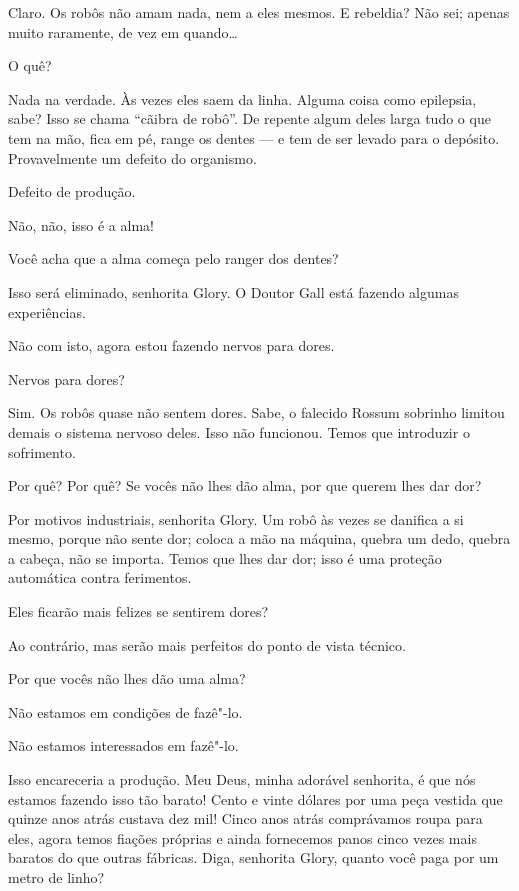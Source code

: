  Claro. Os robôs não amam nada, nem a eles mesmos. E rebeldia? Não
sei; apenas muito raramente, de vez em quando\ldots{}

 O quê?

 Nada na verdade. Às vezes eles saem da linha. Alguma coisa como
epilepsia, sabe? Isso se chama ``cãibra de robô''. De repente algum deles larga
tudo o que tem na mão, fica em pé, range os dentes --- e tem de ser levado para o depósito.
Provavelmente um defeito do organismo.

 Defeito de produção.

 Não, não, isso é a alma!

 Você acha que a alma começa pelo ranger dos dentes?

 Isso será eliminado, senhorita Glory. O Doutor Gall está fazendo algumas
experiências.

 Não com isto, agora estou fazendo nervos para dores.

 Nervos para dores?

 Sim. Os robôs quase não sentem dores. Sabe, o falecido Rossum sobrinho
limitou demais o sistema nervoso deles. Isso não funcionou. Temos que introduzir
o sofrimento.

 Por quê? Por quê? Se vocês não lhes dão alma, por que querem lhes dar
dor?

 Por motivos industriais, senhorita Glory. Um robô às vezes se danifica
a si mesmo, porque não sente dor; coloca a mão na máquina, quebra um dedo,
quebra a cabeça, não se importa. Temos que lhes dar dor; isso é uma proteção
automática contra ferimentos.

 Eles ficarão mais felizes se sentirem dores?

 Ao contrário, mas serão mais perfeitos do ponto de vista técnico.

 Por que vocês não lhes dão uma alma?

 Não estamos em condições de fazê"-lo.

 Não estamos interessados em fazê"-lo.

 Isso encareceria a produção. Meu Deus, minha adorável senhorita, é que nós estamos
fazendo isso tão barato! Cento e vinte dólares por uma peça vestida que quinze
anos atrás custava dez mil! Cinco anos atrás comprávamos roupa para eles, agora
temos fiações próprias e ainda fornecemos panos cinco vezes mais baratos do que
outras fábricas. Diga, senhorita Glory, quanto você paga por um metro de linho?

